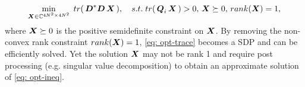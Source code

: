 \begin{align}\label{eq: opt-trace}
\min_{\boldsymbol{X}\in\mathbb{C}^{4N^2\times 4N^2}}\;tr(\, \boldsymbol{D}^*\boldsymbol{D}\,\boldsymbol{X}\,),\quad
s.t. \; tr(\,\boldsymbol{Q}_i\,\boldsymbol{X}\,) > 0,\, \boldsymbol{X}\succeq 0,\, rank(\boldsymbol{X}) = 1,
\end{align}
where $\boldsymbol{X}\succeq 0$ is the positive semidefinite constraint on $\boldsymbol{X}$.
By removing the non-convex rank constraint $rank(\boldsymbol{X}) = 1$, \eqref{eq: opt-trace} becomes a SDP and can be efficiently solved. Yet the solution $\boldsymbol{X}$ may not be rank 1 and require post processing (e.g. singular value decomposition) to obtain an approximate solution of \eqref{eq: opt-ineq}.
